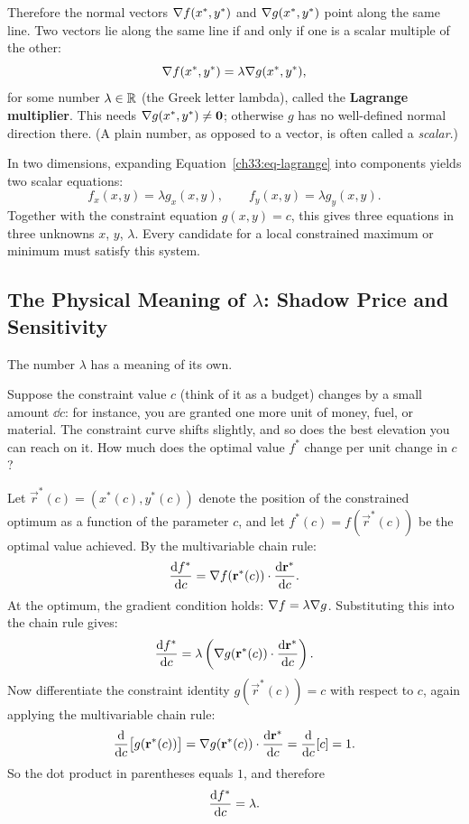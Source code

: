 Therefore the normal vectors $\nabla f(x^*, y^*)$ and $\nabla g(x^*, y^*)$ point along the same line. Two vectors lie along the same line if and only if one is a scalar multiple of the other:
\begin{equation}
\nabla f(x^*, y^*) = \lambda \nabla g(x^*, y^*),
\label{ch33:eq-lagrange}
\end{equation}
for some number $\lambda \in \mathbb{R}$ (the Greek letter lambda), called the \textbf{Lagrange multiplier}. This needs $\nabla g(x^*, y^*) \neq \mathbf{0}$; otherwise $g$ has no well-defined normal direction there. (A plain number, as opposed to a vector, is often called a \emph{scalar}.)

In two dimensions, expanding Equation~\eqref{ch33:eq-lagrange} into components yields two scalar equations:
\[
f_x(x,y) = \lambda g_x(x,y), \qquad f_y(x,y) = \lambda g_y(x,y).
\]
Together with the constraint equation $g(x,y) = c$, this gives three equations in three unknowns $x$, $y$, $\lambda$. Every candidate for a local constrained maximum or minimum must satisfy this system.

\subsection{The Physical Meaning of \texorpdfstring{$\lambda$}{lambda}: Shadow Price and Sensitivity}

The number $\lambda$ has a meaning of its own.

Suppose the constraint value $c$ (think of it as a budget) changes by a small amount $\dd c$: for instance, you are granted one more unit of money, fuel, or material. The constraint curve shifts slightly, and so does the best elevation you can reach on it. How much does the optimal value $f^*$ change per unit change in $c$?

Let $\vec{r}^*(c) = (x^*(c), y^*(c))$ denote the position of the constrained optimum as a function of the parameter $c$, and let $f^*(c) = f(\vec{r}^*(c))$ be the optimal value achieved. By the multivariable chain rule:
\[
\frac{\mathrm{d} f^*}{\mathrm{d} c} = \nabla f(\mathbf{r}^*(c)) \cdot \frac{\mathrm{d} \mathbf{r}^*}{\mathrm{d} c}.
\]
At the optimum, the gradient condition holds: $\nabla f = \lambda \nabla g$. Substituting this into the chain rule gives:
\[
\frac{\mathrm{d} f^*}{\mathrm{d} c} = \lambda \left( \nabla g(\mathbf{r}^*(c)) \cdot \frac{\mathrm{d} \mathbf{r}^*}{\mathrm{d} c} \right).
\]
Now differentiate the constraint identity $g(\vec{r}^*(c)) = c$ with respect to $c$, again applying the multivariable chain rule:
\[
\frac{\mathrm{d} }{\mathrm{d} c}\big[g(\mathbf{r}^*(c))\big] = \nabla g(\mathbf{r}^*(c)) \cdot \frac{\mathrm{d} \mathbf{r}^*}{\mathrm{d} c} = \frac{\mathrm{d} }{\mathrm{d} c}[c] = 1.
\]
So the dot product in parentheses equals $1$, and therefore
\begin{equation}
\frac{\mathrm{d} f^*}{\mathrm{d} c} = \lambda.
\label{ch33:eq-shadow-price}
\end{equation}

